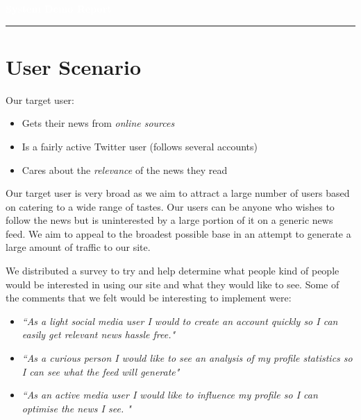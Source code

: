\documentclass[11pt]{article}
\author{%
    	\textbf{Katharine Cooney}\\
    \texttt{katharine.cooney@ucdconnect.ie}\vspace{10pt} \\
       \textbf{ Liam Creagh}\\
    \texttt{liam.creagh@ucdconnect.ie}\vspace{10pt} \\
        \textbf{James Doolan}\\
    \texttt{james.doolan@ucdconnect.ie}\vspace{10pt} \\
        \textbf{Shuyu Huang}\\
    \texttt{shuyu.huang@ucdconnect.ie}\vspace{10pt} \\
       \textbf{ Kang Li}\\
    \texttt{kang.li@ucdconnect.ie}
    }
\makeatletter
\def\printauthor{%
    {\large \@author}}
\makeatother
\begin{document}
\begin{titlepage}
\BgThispage
{}
\vspace*{0.4\textheight}
\noindent
\textcolor{white}{\Huge\textbf{\textsf{System Demo Report}}}
\vspace*{2cm}\par
\noindent
\begin{minipage}{0.55\linewidth}
    \begin{flushright}
        \printauthor
    \end{flushright}
\end{minipage} \hspace{30pt}
%
\begin{minipage}{0.02\linewidth}
    \rule{1pt}{175pt}
\end{minipage} \hspace{-10pt}
%
\begin{minipage}{0.63\linewidth}
\vspace{5pt}

\end{minipage}
\end{titlepage}
\restoregeometry



\section{User Scenario}
Our target user: 
\begin{itemize}
\item Gets their news from \textit{online sources }
\item Is a fairly active Twitter user (follows several accounts) 
\item Cares about the \textit{relevance} of the news they read 

\end{itemize}
Our target user is very broad as we aim to attract a large number of users based on catering to a wide range of tastes. Our users can be anyone who wishes to follow the news but is uninterested by a large portion of it on a generic news feed. We aim to appeal to the broadest possible base in an attempt to generate a large amount of traffic to our site. 

We distributed a survey to try and help determine what people kind of people would be interested in using our site and what they would like to see. Some of the comments that we felt would be interesting to implement were:
\begin{itemize}
\item\textit{``As a light social media user I would to create an account quickly so I can easily get relevant news hassle free."}
\item\textit{``As a curious person I would like to see an analysis of my profile statistics so I can see what the feed will generate"}
\item\textit{``As an active media user I would like to influence my profile so I can optimise the news I see. "}
\end{itemize}
\end{document}
